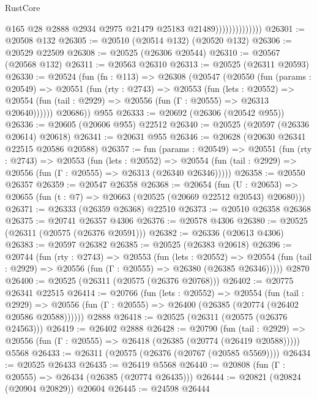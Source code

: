 \begin{lexlean}{RustCore}
\begin{coremodule}
                                @165
                                @28
                                @2888
                                @2934
                                @2975
                                @21479
                                @25183
                                @21489))))))))))))))
@26301 := @20508 @132
@26305 := @20510 (@20514 @132) (@20520 @132)
@26306 := @20529 @22509
@26308 := @20525 (@26306 @20544)
@26310 := @20567 (@20568 @132)
@26311 := @20563 @26310
@26313 := @20525 (@26311 @20593)
@26330 := @20524
    (fun (fn : @113) =>
    @26308
      (@20547
        (@20550
          (fun (params : @20549) =>
          @20551
            (fun (rty : @2743) =>
            @20553
              (fun (lets : @20552) =>
              @20554 (fun (tail : @2929) => @20556 (fun (Γ : @20555) => @26313 @20640))))))
        @20686))
    @955
@26333 := @20692 (@26306 (@20542 @955))
@26336 := @20605 (@20606 @955) @22512
@26340 := @20525 (@20597 (@26336 @20614) @20618)
@26341 := @20631 @955
@26346 := @20628 (@20630 @26341 @22515 @20586 @20588)
@26357 := fun (params : @20549) =>
  @20551
    (fun (rty : @2743) =>
    @20553
      (fun (lets : @20552) =>
      @20554 (fun (tail : @2929) => @20556 (fun (Γ : @20555) => @26313 (@26340 @26346)))))
@26358 := @20550 @26357
@26359 := @20547 @26358
@26368 := @20654
    (fun (U : @20653) => @20655 (fun (t : @7) => @20663 (@20525 (@20669 @22512 @20543) @20680)))
@26371 := @26333 (@26359 @26368) @22510
@26373 := @20510 @26358 @26368
@26375 := @20741 @26357 @4306
@26376 := @20578 @4306
@26380 := @20525 (@26311 (@20575 (@26376 @20591)))
@26382 := @26336 (@20613 @4306)
@26383 := @20597 @26382
@26385 := @20525 (@26383 @20618)
@26396 := @20744
    (fun (rty : @2743) =>
    @20553
      (fun (lets : @20552) =>
      @20554 (fun (tail : @2929) => @20556 (fun (Γ : @20555) => @26380 (@26385 @26346)))))
    @2870
@26400 := @20525 (@26311 (@20575 (@26376 @20768)))
@26402 := @20775 @26341 @22515
@26414 := @20766
    (fun (lets : @20552) =>
    @20554
      (fun (tail : @2929) =>
      @20556 (fun (Γ : @20555) => @26400 (@26385 (@20774 (@26402 @20586 @20588))))))
    @2888
@26418 := @20525 (@26311 (@20575 (@26376 @24563)))
@26419 := @26402 @2888
@26428 := @20790
    (fun (tail : @2929) => @20556 (fun (Γ : @20555) => @26418 (@26385 (@20774 (@26419 @20588)))))
    @5568
@26433 := @26311 (@20575 (@26376 (@20767 (@20585 @5569))))
@26434 := @20525 @26433
@26435 := @26419 @5568
@26440 := @20808 (fun (Γ : @20555) => @26434 (@26385 (@20774 @26435)))
@26444 := @20821 (@20824 (@20904 @20829)) @20604
@26445 := @24598 @26444

\end{coremodule}
\end{lexlean}
